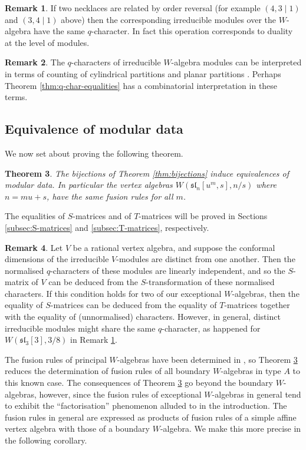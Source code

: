 \documentclass[12pt]{amsart}
\theoremstyle{plain}
\newtheorem{thm}{Theorem}[section]
\theoremstyle{definition}
\newtheorem{rem}[thm]{Remark}
\numberwithin{equation}{section}
\newcommand{\sll}{\mathfrak{sl}}
\begin{document}
\begin{rem}\label{rem:equal.q.char}
If two necklaces are related by order reversal (for example $(4, 3 \mid 1)$ and $(3, 4 \mid 1)$ above) then the corresponding irreducible modules over the $W$-algebra have the same $q$-character. In fact this operation corresponds to duality at the level of modules.
\end{rem}

\begin{rem}
The $q$-characters of irreducible $W$-algebra modules can be interpreted in terms of counting of cylindrical partitions \cite{FW2016} and planar partitions \cite{PW2024}. Perhaps Theorem \ref{thm:q-char-equalities} has a combinatorial interpretation in these terms.
\end{rem}


\subsection{Equivalence of modular data}\label{sec:type.A.moddata}

We now set about proving the following theorem.
\begin{thm}\label{thm:S-mat.equal}
The bijections of Theorem \ref{thm:bijections} induce equivalences of modular data. In particular the vertex algebras $W(\sll_n[u^m, s], n/s)$ where $n = mu+s$, have the same fusion rules for all $m$.
\end{thm}
The equalities of $S$-matrices and of $T$-matrices will be proved in Sections \ref{subsec:S-matrices} and \ref{subsec:T-matrices}, respectively.
\begin{rem}
Let $V$ be a rational vertex algebra, and suppose the conformal dimensions of the irreducible $V$-modules are distinct from one another. Then the normalised $q$-characters of these modules are linearly independent, and so the $S$-matrix of $V$ can be deduced from the $S$-transformation of these normalised characters. If this condition holds for two of our exceptional $W$-algebras, then the equality of $S$-matrices can be deduced from the equality of $T$-matrices together with the equality of (unnormalised) characters. However, in general, distinct irreducible modules might share the same $q$-character, as happened for $W(\sll_3[3], 3/8)$ in Remark \ref{rem:equal.q.char}.
\end{rem}

The fusion rules of principal $W$-algebras have been determined in \cite{FKW}, so Theorem \ref{thm:S-mat.equal} reduces the determination of fusion rules of all boundary $W$-algebras in type $A$ to this known case. The consequences of Theorem \ref{thm:S-mat.equal} go beyond the boundary $W$-algebras, however, since the fusion rules of exceptional $W$-algebras in general tend to exhibit the ``factorisation'' phenomenon alluded to in the introduction. The fusion rules in general are expressed as products of fusion rules of a simple affine vertex algebra with those of a boundary $W$-algebra. We make this more precise in the following corollary.
\end{document}

